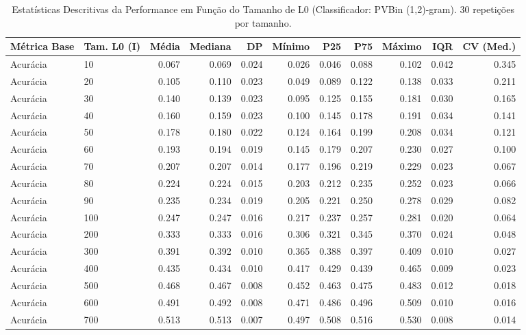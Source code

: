 \begin{table}[htbp]
\begin{table}
\caption{Estatísticas Descritivas da Performance em Função do Tamanho de L0 (Classificador: PVBin (1,2)-gram). 30 repetições por tamanho.}
\label{tab:l0_random_stats_analysis}
\centering
\begin{tabular}{ll|rrrrrrrrr}
\toprule
Métrica Base & Tam. L0 (I) & Média & Mediana & DP & Mínimo & P25 & P75 & Máximo & IQR & CV (Med.) \\
\midrule
Acurácia & 10 & 0.067 & 0.069 & 0.024 & 0.026 & 0.046 & 0.088 & 0.102 & 0.042 & 0.345 \\
Acurácia & 20 & 0.105 & 0.110 & 0.023 & 0.049 & 0.089 & 0.122 & 0.138 & 0.033 & 0.211 \\
Acurácia & 30 & 0.140 & 0.139 & 0.023 & 0.095 & 0.125 & 0.155 & 0.181 & 0.030 & 0.165 \\
Acurácia & 40 & 0.160 & 0.159 & 0.023 & 0.100 & 0.145 & 0.178 & 0.191 & 0.034 & 0.141 \\
Acurácia & 50 & 0.178 & 0.180 & 0.022 & 0.124 & 0.164 & 0.199 & 0.208 & 0.034 & 0.121 \\
Acurácia & 60 & 0.193 & 0.194 & 0.019 & 0.145 & 0.179 & 0.207 & 0.230 & 0.027 & 0.100 \\
Acurácia & 70 & 0.207 & 0.207 & 0.014 & 0.177 & 0.196 & 0.219 & 0.229 & 0.023 & 0.067 \\
Acurácia & 80 & 0.224 & 0.224 & 0.015 & 0.203 & 0.212 & 0.235 & 0.252 & 0.023 & 0.066 \\
Acurácia & 90 & 0.235 & 0.234 & 0.019 & 0.205 & 0.221 & 0.250 & 0.278 & 0.029 & 0.082 \\
Acurácia & 100 & 0.247 & 0.247 & 0.016 & 0.217 & 0.237 & 0.257 & 0.281 & 0.020 & 0.064 \\
Acurácia & 200 & 0.333 & 0.333 & 0.016 & 0.306 & 0.321 & 0.345 & 0.370 & 0.024 & 0.048 \\
Acurácia & 300 & 0.391 & 0.392 & 0.010 & 0.365 & 0.388 & 0.397 & 0.409 & 0.010 & 0.027 \\
Acurácia & 400 & 0.435 & 0.434 & 0.010 & 0.417 & 0.429 & 0.439 & 0.465 & 0.009 & 0.023 \\
Acurácia & 500 & 0.468 & 0.467 & 0.008 & 0.452 & 0.463 & 0.475 & 0.483 & 0.012 & 0.018 \\
Acurácia & 600 & 0.491 & 0.492 & 0.008 & 0.471 & 0.486 & 0.496 & 0.509 & 0.010 & 0.016 \\
Acurácia & 700 & 0.513 & 0.513 & 0.007 & 0.497 & 0.508 & 0.516 & 0.530 & 0.008 & 0.014 \\

\end{tabular}
\end{table}
\end{table}
